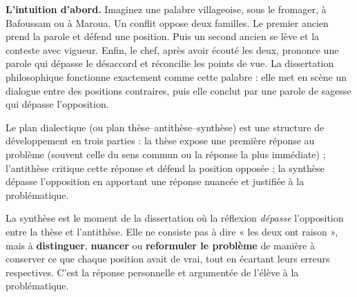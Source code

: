 \documentclass[11pt]{article}
\newcommand{\cle}[1]{{\popxbold\color{popdark}#1}}
\begin{document}
\textbf{L'intuition d'abord.} Imaginez une palabre villageoise, sous le fromager, à Bafoussam ou à Maroua. Un conflit oppose deux familles. Le premier ancien prend la parole et défend une position. Puis un second ancien se lève et la conteste avec vigueur. Enfin, le chef, après avoir écouté les deux, prononce une parole qui dépasse le désaccord et réconcilie les points de vue. La dissertation philosophique fonctionne exactement comme cette palabre : elle met en scène un dialogue entre des positions contraires, puis elle conclut par une parole de sagesse qui dépasse l'opposition.

\begin{definition}
Le \cle{plan dialectique} (ou plan thèse--antithèse--synthèse) est une structure de développement en trois parties : la \cle{thèse} expose une première réponse au problème (souvent celle du sens commun ou la réponse la plus immédiate) ; l'\cle{antithèse} critique cette réponse et défend la position opposée ; la \cle{synthèse} dépasse l'opposition en apportant une réponse nuancée et justifiée à la problématique.
\end{definition}

\begin{definition}[La synthèse]
La \cle{synthèse} est le moment de la dissertation où la réflexion \emph{dépasse} l'opposition entre la thèse et l'antithèse. Elle ne consiste pas à dire « les deux ont raison », mais à \textbf{distinguer}, \textbf{nuancer} ou \textbf{reformuler le problème} de manière à conserver ce que chaque position avait de vrai, tout en écartant leurs erreurs respectives. C'est la réponse personnelle et argumentée de l'élève à la problématique.
\end{definition}
\end{document}
